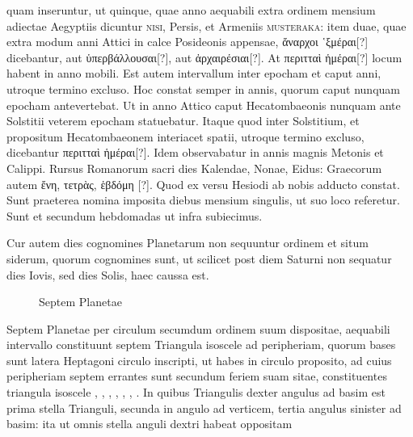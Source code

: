 quam inseruntur, ut quinque, quae anno aequabili extra ordinem mensium
adiectae Aegyptiis dicuntur \textsc{nisi}, Persis, et Armeniis
 \textsc{musteraka}: 
item duae, quae extra modum anni Attici in calce Posideonis
appensae, \textgreek{ἄναρχοι ῾ξμέραι[?]} dicebantur,
 aut \textgreek{ὑπερβάλλουσαι[?]}, aut \textgreek{ἀρχαιρέσιαι[?]}.
At \textgreek{περιτταὶ ἡμέραι[?]} locum habent in anno mobili.
Est autem intervallum
inter epocham et caput anni, utroque termino excluso.
Hoc
constat semper in annis, quorum caput nunquam epocham antevertebat.
Ut in anno Attico caput Hecatombaeonis nunquam ante Solstitii
veterem epocham statuebatur.
Itaque quod inter Solstitium, et
propositum Hecatombaeonem interiacet spatii, utroque termino excluso,
dicebantur \textgreek{περιτταὶ ἡμέραι[?]}.
Idem observabatur in annis magnis
Metonis et Calippi.
Rursus Romanorum sacri dies Kalendae, Nonae,
Eidus: Graecorum autem \textgreek{ἔνη, τετρὰς, ἑβδόμη [?]}.
Quod ex versu Hesiodi ab
nobis adducto constat.
Sunt praeterea nomina imposita diebus mensium
singulis, ut suo loco referetur.
Sunt et secundum hebdomadas
ut infra subiecimus.
\begin{table}[hbtp]
  
\end{table}
%
Cur autem dies cognomines Planetarum non sequuntur ordinem et
situm siderum, quorum cognomines sunt, ut scilicet post diem Saturni
non sequatur dies Iovis, sed dies Solis, haec caussa est.
\begin{figure}[hbtp]
  \centering
  \def\svgwidth{9\baselineskip}
  {\astrofont}
  \caption{Septem Planetae}
  \label{fig:p008}
\end{figure}
Septem Planetae
per circulum secumdum ordinem suum
dispositae, aequabili intervallo constituunt septem
Triangula isoscele ad peripheriam, quorum
bases sunt latera Heptagoni circulo inscripti,
ut habes in circulo proposito, ad cuius
peripheriam septem errantes sunt secundum
feriem suam sitae, constituentes triangula
isoscele , , ,
 , , , .
In quibus Triangulis dexter angulus ad basim
est prima stella Trianguli, secunda in angulo ad verticem, tertia angulus
sinister ad basim: ita ut omnis stella anguli dextri habeat oppositam

